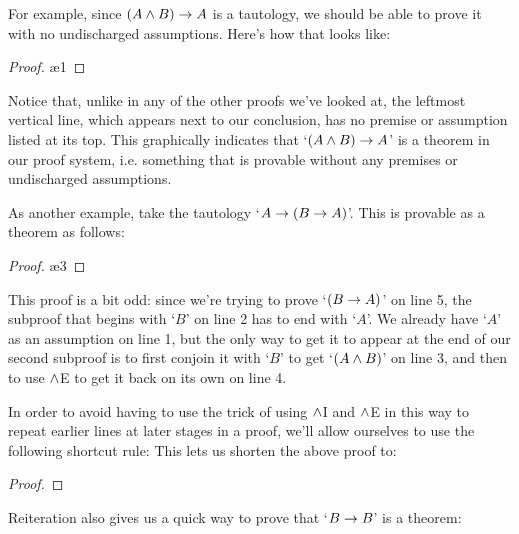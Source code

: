 For example, since $(A \wedge B) \rightarrow A$ is a tautology, we should be able to prove it with no undischarged assumptions.  Here's how that looks like:\\
\begin{proof}
\open
{}
 \ae{1}
\close
{} 
\end{proof}
\noindent Notice that, unlike in any of the other proofs we've looked at, the leftmost vertical line, which appears next to our conclusion, has no premise or assumption listed at its top.  This graphically indicates that `$(A\wedge B)\rightarrow A$' is a theorem in our proof system, i.e. something that is provable without any premises or undischarged assumptions.

As another example, take the tautology `$A \rightarrow (B \rightarrow A)$'.  This is provable as a theorem as follows:\\
\begin{proof}
\open
{}
\open
{} 
 
 \ae{3}
\close
{} 
\close
{} 
\end{proof}
\noindent This proof is a bit odd: since we're trying to prove `$(B \rightarrow A)$' on line 5, the subproof that begins with `$B$' on line 2 has to end with `$A$'.  We already have `$A$' as an assumption on line 1, but the only way to get it to appear at the end of our second subproof is to first conjoin it with `$B$' to get `$(A \wedge B)$' on line 3, and then to use $\wedge$E to get it back on its own on line 4.  

In order to avoid having to use the trick of using $\wedge$I and $\wedge$E in this way to repeat earlier lines at later stages in a proof, we'll allow ourselves to use the following shortcut rule:
This lets us shorten the above proof to:\\

\begin{proof}
\open
{}
\open
{} 
 
\close
{} 
\close
{} 
\end{proof}

\noindent Reiteration also gives us a quick way to prove that `$B \rightarrow B$' is a theorem:\\

